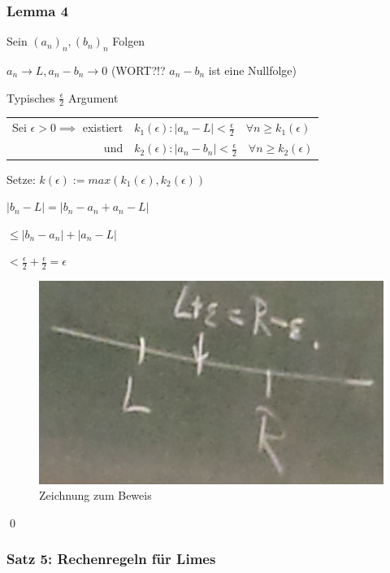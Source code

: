 \documentclass[fleqn]{scrartcl}
\renewenvironment{proof}{{\bfseries Beweis }}{\qed}
\begin{document}
\subsubsection{Lemma 4}

Sein $(a_n)_n,(b_n)_n$ Folgen

$a_n \to L, a_n-b_n \to 0$ (WORT?!? $a_n-b_n$ ist eine Nullfolge)

\begin{proof}

  Typisches $\frac{\epsilon}{2}$ Argument
  
  \begin{tabular}{rl}
    Sei $\epsilon > 0 \implies$ existiert & $k_1(\epsilon): |a_n-L|<\frac{\epsilon}{2} \quad \forall n \geq k_1(\epsilon)$ \\
    
                                      und & $k_2(\epsilon): |a_n-b_n|<\frac{\epsilon}{2} \quad \forall n \geq k_2(\epsilon)$
  \end{tabular}
  
  Setze: $k(\epsilon):=max(k_1(\epsilon),k_2(\epsilon))$
  
  $|b_n-L| = |b_n-a_n+a_n-L|$
  
  $\leq |b_n -a_n|+|a_n-L|$
  
  $<\frac{\epsilon}{2}+\frac{\epsilon}{2}=\epsilon$
  
  \begin{figure}[!ht]
    \centering
      \includegraphics[scale=0.4]{img/2/3}
    \caption{Zeichnung zum Beweis}
  \end{figure}
 
\end{proof}

\subsubsection{Satz 5: Rechenregeln für Limes}
\end{document}
